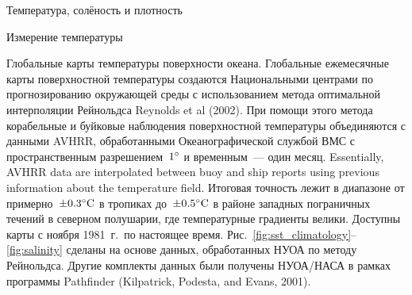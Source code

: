 \begin{chapter}{Температура, солёность и плотность}
\begin{section}{Измерение температуры}
\begin{paragraph}{Глобальные карты температуры поверхности океана.}
Глобальные ежемесячные карты поверхностной температуры создаются
Национальными центрами по прогнозированию окружающей среды
с использованием метода оптимальной интерполяции Рейнольдса Reynolds et al (2002). 
При помощи этого метода корабельные и буйковые наблюдения поверхностной 
температуры объединяются с данными AVHRR, обработанными Океанографической 
службой ВМС с пространственным разрешением~${1}^\circ$ и временным~---
один месяц. Essentially, AVHRR data are interpolated between buoy 
and ship reports using previous information about the temperature field.
Итоговая точность лежит в диапазоне от примерно~$\pm{0.3}^\circ\mbox{C}$ в тропиках
до~$\pm{0.5}^\circ\mbox{C}$ в районе западных пограничных течений в северном
полушарии, где температурные градиенты велики. Доступны карты с ноября 
1981~г.\ по настоящее время. Рис.~\ref{fig:sst_climatology}--\ref{fig:salinity} 
сделаны на основе данных, обработанных НУОА по методу Рейнольдса. 
Другие комплекты данных были получены НУОА/НАСА в рамках программы 
Pathfinder (Kilpatrick, Podesta, and Evans, 2001).
%


\end{paragraph}
\end{section}
\end{chapter}
